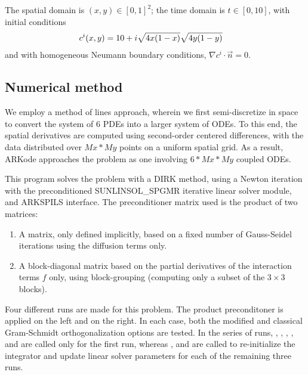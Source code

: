 \documentclass[letterpaper,10pt,english]{sphinxmanual}
\begin{document}
The spatial domain is \((x,y) \in [0, 1]^2\); the time domain is
\(t \in [0,10]\), with initial conditions
\begin{gather}
\begin{split}c^i(x,y) &=  10 + i \sqrt{4x(1-x)}\sqrt{4y(1-y)}\end{split}\notag
\end{gather}
and with homogeneous Neumann boundary conditions,
\(\nabla c^i \cdot \vec{n} = 0\).


\subsection{Numerical method}
\label{c_serial:id30}
We employ a method of lines approach, wherein we first semi-discretize
in space to convert the system of 6 PDEs into a larger system of ODEs.
To this end, the spatial derivatives are computed using second-order
centered differences, with the data distributed over \(Mx*My\)
points on a uniform spatial grid.  As a result, ARKode approaches the
problem as one involving \(6*Mx*My\) coupled ODEs.

This program solves the problem with a DIRK method, using a Newton
iteration with the preconditioned SUNLINSOL\_SPGMR iterative linear
solver module, and ARKSPILS interface.  The preconditioner matrix used
is the product of two matrices:
\begin{enumerate}
\item {} 
A matrix, only defined implicitly, based on a fixed number of
Gauss-Seidel iterations using the diffusion terms only.

\item {} 
A block-diagonal matrix based on the partial derivatives of the
interaction terms \(f\) only, using block-grouping (computing
only a subset of the \(3\times3\) blocks).

\end{enumerate}

Four different runs are made for this problem.  The product
preconditoner is applied on the left and on the right.  In each case,
both the modified and classical Gram-Schmidt orthogonalization options
are tested.  In the series of runs, , ,
, ,
 and  are called
only for the first run, whereas ,
 and  are called to
re-initialize the integrator and update linear solver parameters for
each of the remaining three runs.
\end{document}
